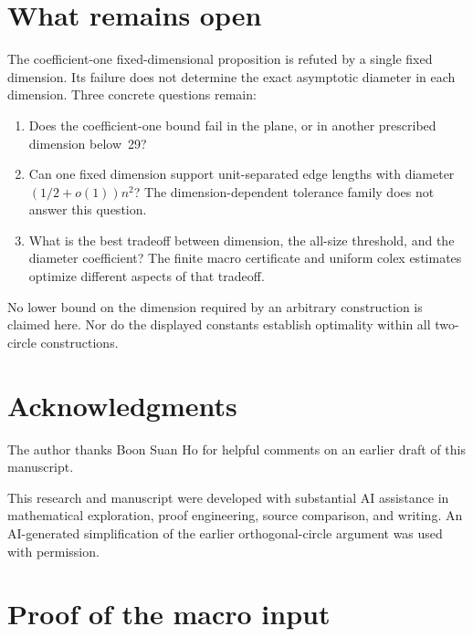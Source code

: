 \documentclass[11pt]{article}
\numberwithin{equation}{section}
\theoremstyle{definition}\newtheorem{definition}[theorem]{Definition}
\theoremstyle{remark}\newtheorem{remark}[theorem]{Remark}
\begin{document}
\section{What remains open}\label{sec:open}

The coefficient-one fixed-dimensional proposition is refuted by a single
fixed dimension. Its failure does not determine the exact asymptotic
diameter in each dimension. Three concrete questions remain:
\begin{enumerate}[leftmargin=1.7em,itemsep=4pt]
\item Does the coefficient-one bound fail in the plane, or in another
 prescribed dimension below~29?
\item Can one fixed dimension support unit-separated edge lengths
 with diameter $(1/2+o(1))n^2$? The dimension-dependent tolerance family does
 not answer this question.
\item What is the best tradeoff between dimension, the all-size threshold,
 and the diameter coefficient? The finite macro certificate and uniform
 colex estimates optimize different aspects of that tradeoff.
\end{enumerate}
No lower bound on the dimension required by an arbitrary construction is
claimed here. Nor do the displayed constants establish optimality within
all two-circle constructions.

\section*{Acknowledgments}
The author thanks Boon Suan Ho for helpful comments on an earlier draft of this manuscript.

This research and manuscript were developed with substantial AI assistance
in mathematical exploration, proof engineering, source comparison, and
writing. An AI-generated simplification of the earlier orthogonal-circle
argument was used with permission.


\appendix
\section{Proof of the macro input}\label{app:macro}
\end{document}
